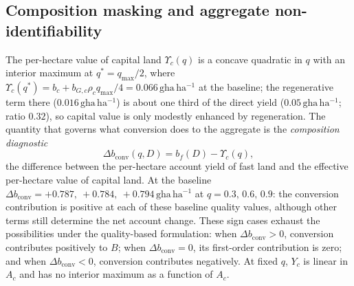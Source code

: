\documentclass[preprint,12pt,authoryear]{elsarticle}
\newcommand{\dconv}{\Delta b_{\mathrm{conv}}}
\newcommand{\Ups}{\Upsilon_c}
\begin{document}
\subsection{Composition masking and aggregate non-identifiability}\label{sec:mask}

The per-hectare value of capital land $\Ups(q)$ is a concave quadratic in $q$ with an interior maximum at $q^*=q_{\max}/2$, where $\Ups(q^*)=b_c+b_{G,c}\rho_c q_{\max}/4=0.066\,\mathrm{gha\,ha^{-1}}$ at the baseline; the regenerative term there ($0.016\,\mathrm{gha\,ha^{-1}}$) is about one third of the direct yield ($0.05\,\mathrm{gha\,ha^{-1}}$; ratio $0.32$), so capital value is only modestly enhanced by regeneration. The quantity that governs what conversion does to the aggregate is the \emph{composition diagnostic}
\begin{equation}\label{eq:dconv}
\dconv(q,D)=b_f(D)-\Ups(q),
\end{equation}
the difference between the per-hectare account yield of fast land and the effective per-hectare value of capital land. At the baseline $\dconv=+0.787,\ +0.784,\ +0.794\,\mathrm{gha\,ha^{-1}}$ at $q=0.3,\,0.6,\,0.9$: the conversion contribution is positive at each of these baseline quality values, although other terms still determine the net account change. These sign cases exhaust the possibilities under the quality-based formulation: when $\dconv>0$, conversion contributes positively to $B$; when $\dconv=0$, its first-order contribution is zero; and when $\dconv<0$, conversion contributes negatively. At fixed $q$, $Y_c$ is linear in $A_c$ and has no interior maximum as a function of $A_c$.
\end{document}
